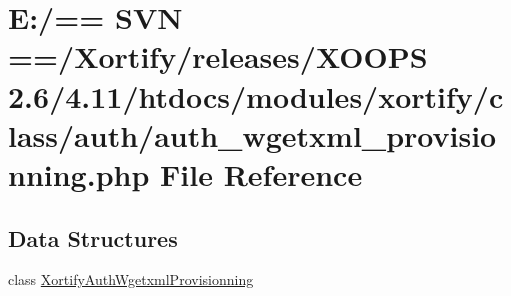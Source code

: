 \hypertarget{auth__wgetxml__provisionning_8php}{\section{E\-:/== S\-V\-N ==/\-Xortify/releases/\-X\-O\-O\-P\-S 2.6/4.11/htdocs/modules/xortify/class/auth/auth\-\_\-wgetxml\-\_\-provisionning.php File Reference}
\label{auth__wgetxml__provisionning_8php}
}
\subsection*{Data Structures}
\begin{DoxyCompactItemize}
\item 
class \hyperlink{class_xortify_auth_wgetxml_provisionning}{Xortify\-Auth\-Wgetxml\-Provisionning}
\end{DoxyCompactItemize}
